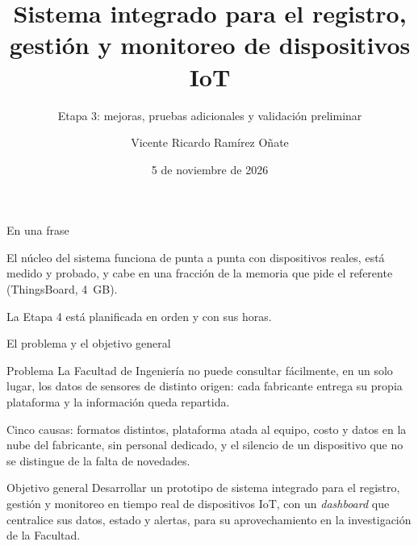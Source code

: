 \documentclass[aspectratio=169,11pt]{beamer}
\title{Sistema integrado para el registro, gestión y monitoreo de dispositivos IoT}
\subtitle{Etapa 3: mejoras, pruebas adicionales y validación preliminar}
\author{Vicente Ricardo Ramírez Oñate}
\institute{INFO-1197 · Universidad Católica de Temuco · Profesor guía: Mario Villanueva}
\date{5 de noviembre de 2026}
\gdef\lafuente{}
\newcommand{\fuente}[1]{\gdef\lafuente{#1}}
\begin{document}
\maketitle

\begin{frame}{En una frase}
  \vfill
  \begin{tarjeta}[halign=left,left=14pt,right=14pt,top=12pt,bottom=12pt,borderline west={3pt}{0pt}{acento}]
    \large El núcleo del sistema funciona de punta a punta con dispositivos reales, está medido y probado, y cabe en una
    fracción de la memoria que pide el referente (ThingsBoard, 4~GB).
  \end{tarjeta}
  \medskip
  La Etapa 4 está planificada en orden y con sus horas.
  \vfill
\end{frame}

\begin{frame}{El problema y el objetivo general}
  \begin{block}{Problema}
    La Facultad de Ingeniería no puede consultar fácilmente, en un solo lugar, los datos de sensores de distinto origen:
    cada fabricante entrega su propia plataforma y la información queda repartida.
  \end{block}
  \footnotesize
  Cinco causas: formatos distintos, plataforma atada al equipo, costo y datos en la nube del fabricante, sin personal
  dedicado, y el silencio de un dispositivo que no se distingue de la falta de novedades.
  \normalsize
  \begin{block}{Objetivo general}
    Desarrollar un prototipo de sistema integrado para el registro, gestión y monitoreo en tiempo real de dispositivos IoT,
    con un \emph{dashboard} que centralice sus datos, estado y alertas, para su aprovechamiento en la investigación de la
    Facultad.
  \end{block}
  \fuente{informe, capítulo 1 (problema central y objetivo general)}
\end{frame}
\end{document}
